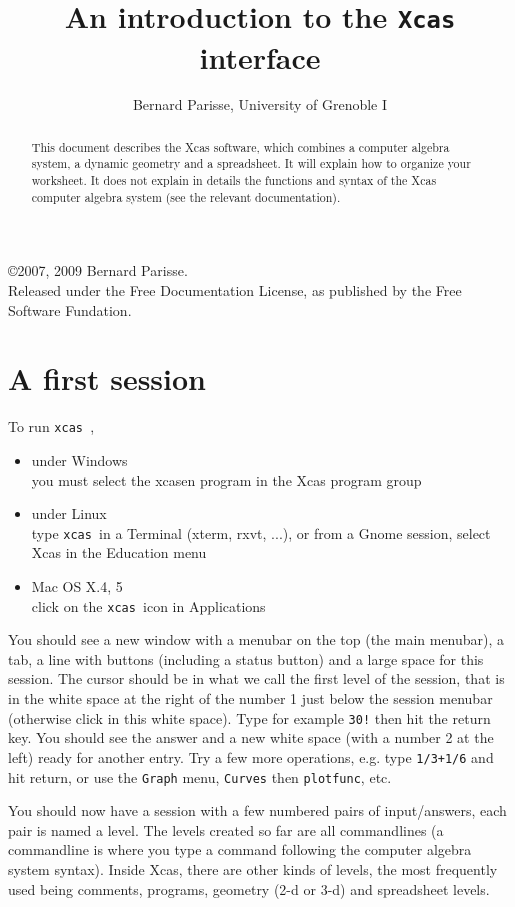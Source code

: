 \documentclass{article}
\title{An introduction to the {\tt Xcas} interface}
\author{Bernard Parisse, University of Grenoble I}
\date{}
\newcommand{\xcas}{{\tt xcas }}
\begin{document}
\maketitle

\copyright 2007, 2009 Bernard Parisse. \\
Released under the Free Documentation License, 
as published by the Free Software Fundation.

\begin{abstract}
This document describes the Xcas software, which combines 
a computer algebra system, a dynamic geometry and a spreadsheet. 
It will explain how to organize your worksheet. It does not
explain in details the functions and syntax of the Xcas 
computer algebra system (see the relevant documentation).
\end{abstract}

\section{A first session}
To run \xcas, 
\begin{itemize}
\item under Windows\\
you must select the xcasen program in the Xcas program group
\item under Linux\\
type \xcas in a Terminal (xterm, rxvt, ...), 
or from a Gnome session, select Xcas in the Education menu
\item Mac OS X.4, 5\\
click on the \xcas icon in Applications
\end{itemize}

You should see a new window with a menubar on the top (the main
menubar), a tab, a line with buttons (including a status button)
and a large space for this session. The cursor should
be in what we call the first level of the session, that is in 
the white space at the right of the number 1 just
below the session menubar (otherwise click in this white space).
Type for example {\tt 30!} then hit the return key. 
You should see the answer and a new white space (with a number
2 at the left) ready for another entry.
Try a few more operations, e.g. type {\tt 1/3+1/6}
and hit return, or use the {\tt Graph} menu, {\tt Curves} then
{\tt plotfunc}, etc.

You should now have a session with a few numbered pairs of
input/answers, each pair is named a level. The levels created so far
are all commandlines (a commandline is where you
type a command following the computer algebra system syntax).
Inside Xcas, there are other kinds of levels, the most frequently used
being comments, programs, geometry (2-d or 3-d) and spreadsheet levels.
\end{document}
